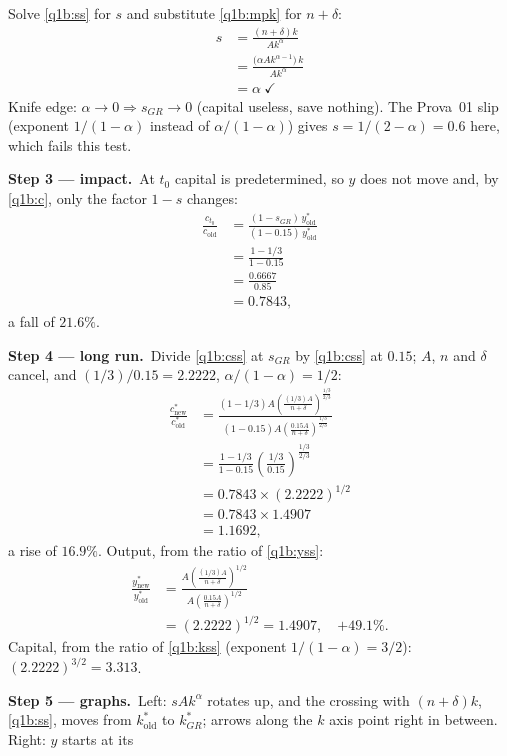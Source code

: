 \documentclass[11pt,a4paper]{article}
\newcommand{\passo}[2]{\par\smallskip\noindent\textbf{Step #1.}~#2}
\begin{document}
\begin{sol}
{Solve \eqref{q1b:ss} for $s$ and substitute \eqref{q1b:mpk} for $n+\delta$:
\begin{align*}
s &= \frac{(n+\delta)k}{Ak^{\alpha}}\\
&= \frac{\big(\alpha Ak^{\alpha-1}\big)\,k}{Ak^{\alpha}}\\
&= \alpha\ \checkmark
\end{align*}
Knife edge: $\alpha\to0\Rightarrow s_{GR}\to0$ (capital useless, save nothing). The Prova~01 slip (exponent
$1/(1-\alpha)$ instead of $\alpha/(1-\alpha)$) gives $s=1/(2-\alpha)=0.6$ here, which fails this test.}
\passo{3 --- impact}{At $t_0$ capital is predetermined, so $y$ does not move and, by \eqref{q1b:c}, only the
factor $1-s$ changes:
\begin{align*}
\frac{c_{t_0}}{c_{\text{old}}} &= \frac{(1-s_{GR})\,y^*_{\text{old}}}{(1-0.15)\,y^*_{\text{old}}}\\
&= \frac{1-1/3}{1-0.15}\\
&= \frac{0.6667}{0.85}\\
&= 0.7843,
\end{align*}
a fall of $\boxed{21.6\%}$.}
\passo{4 --- long run}{Divide \eqref{q1b:css} at $s_{GR}$ by \eqref{q1b:css} at $0.15$; $A$, $n$ and $\delta$ cancel,
and $(1/3)/0.15=2.2222$, $\alpha/(1-\alpha)=1/2$:
\begin{align*}
\frac{c^*_{\text{new}}}{c^*_{\text{old}}} &= \frac{(1-1/3)A\left(\frac{(1/3)A}{n+\delta}\right)^{\frac{1/3}{2/3}}}
{(1-0.15)A\left(\frac{0.15A}{n+\delta}\right)^{\frac{1/3}{2/3}}}\\
&= \frac{1-1/3}{1-0.15}\left(\frac{1/3}{0.15}\right)^{\frac{1/3}{2/3}}\\
&= 0.7843\times(2.2222)^{1/2}\\
&= 0.7843\times1.4907\\
&= 1.1692,
\end{align*}
a rise of $\boxed{16.9\%}$. Output, from the ratio of \eqref{q1b:yss}:
\begin{align*}
\frac{y^*_{\text{new}}}{y^*_{\text{old}}} &= \frac{A\left(\frac{(1/3)A}{n+\delta}\right)^{1/2}}{A\left(\frac{0.15A}{n+\delta}\right)^{1/2}}\\
&= (2.2222)^{1/2}=1.4907,\quad\boxed{+49.1\%}.
\end{align*}
Capital, from the ratio of \eqref{q1b:kss} (exponent $1/(1-\alpha)=3/2$): $(2.2222)^{3/2}=3.313$.}
\passo{5 --- graphs}{Left: $sAk^{\alpha}$ rotates up, and the crossing with $(n+\delta)k$, \eqref{q1b:ss}, moves
from $k^*_{\text{old}}$ to $k^*_{GR}$; arrows along the $k$ axis point right in between. Right: $y$ starts at its
}
\end{sol}
\end{document}
